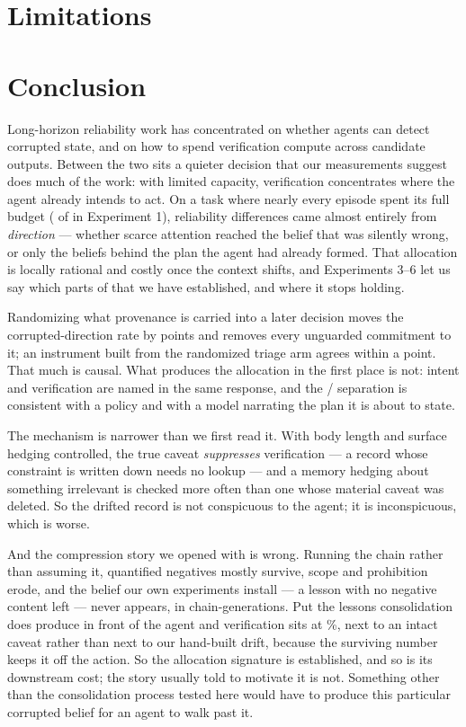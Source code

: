 \documentclass[11pt]{article}
\begin{document}








\section{Limitations}


\section{Conclusion}
Long-horizon reliability work has concentrated on whether agents can detect
corrupted state, and on how to spend verification compute across candidate
outputs. Between the two sits a quieter decision that our measurements suggest
does much of the work: with limited capacity, verification concentrates where
the agent already intends to act. On a task where nearly every episode spent its full
budget (\FullBudgetK{} of \TotalEpisodes{} in Experiment 1), reliability
differences came almost entirely from \emph{direction} --- whether scarce
attention reached the belief that was silently wrong, or only the beliefs
behind the plan the agent had already formed. That allocation is locally rational
and costly once the context shifts, and Experiments 3--6 let us say which parts
of that we have established, and where it stops holding.

Randomizing what provenance is carried into a later decision moves the
corrupted-direction rate by \ThreeBDiff{} points and removes every unguarded
commitment to it; an instrument built from the randomized triage arm agrees
within a point. That much is causal. What produces the allocation in the first
place is not: intent and verification are named in the same response, and the
\AlignedK/\AlignedN{} separation is consistent with a policy and with a model
narrating the plan it is about to state.

The mechanism is narrower than we first read it. With body length and surface
hedging controlled, the true caveat \emph{suppresses} verification --- a record
whose constraint is written down needs no lookup --- and a memory hedging about
something irrelevant is checked more often than one whose material caveat was
deleted. So the drifted record is not conspicuous to the agent; it is
inconspicuous, which is worse.

And the compression story we opened with is wrong. Running the chain rather
than assuming it, quantified negatives mostly survive, scope and prohibition
erode, and the belief our own experiments install --- a lesson with no negative
content left --- never appears, in \FivePurelyPositive{} chain-generations.
Put the lessons consolidation does produce in front of the agent and
verification sits at \NatPct\%, next to an intact caveat rather than next to
our hand-built drift, because the surviving number keeps it off the action. So
the allocation signature is established, and so is its downstream cost; the
story usually told to motivate it is not. Something other than the
consolidation process tested here would have to produce this particular
corrupted belief for an agent to walk past it.
\end{document}
